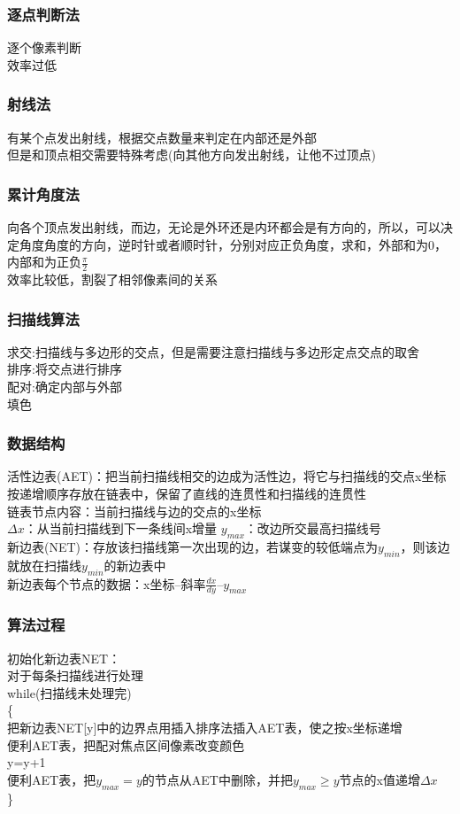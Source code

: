 \documentclass{article}
\begin{document}
\begin{CJK}{UTF8}{gbsn}
	\subsubsection{逐点判断法}
	逐个像素判断\\
	效率过低\\
	\subsubsection{射线法}
	有某个点发出射线，根据交点数量来判定在内部还是外部\\
	但是和顶点相交需要特殊考虑(向其他方向发出射线，让他不过顶点)\\
		\subsubsection{累计角度法}
		向各个顶点发出射线，而边，无论是外环还是内环都会是有方向的，所以，可以决定角度角度的方向，逆时针或者顺时针，分别对应正负角度，求和，外部和为0，内部和为正负$\frac{\pi}{2}$\\
		效率比较低，割裂了相邻像素间的关系\\
	\subsubsection{扫描线算法}
	求交:扫描线与多边形的交点，但是需要注意扫描线与多边形定点交点的取舍\\
	排序:将交点进行排序\\
	配对:确定内部与外部\\
	填色
	\subsubsection*{数据结构}
	活性边表(AET)：把当前扫描线相交的边成为活性边，将它与扫描线的交点x坐标按递增顺序存放在链表中，保留了直线的连贯性和扫描线的连贯性\\
	链表节点内容：当前扫描线与边的交点的x坐标\\
	$\Delta x$：从当前扫描线到下一条线间x增量
	$y_{max}$：改边所交最高扫描线号\\
	新边表(NET)：存放该扫描线第一次出现的边，若谋变的较低端点为$y_{min}$，则该边就放在扫描线$y_{min}$的新边表中\\
	新边表每个节点的数据：x坐标--斜率$\frac{dx}{dy}$--$y_{max}$\\
	\subsubsection*{算法过程}
	初始化新边表NET：\\
	对于每条扫描线进行处理\\
	while(扫描线未处理完)\\
	\{\\
	把新边表NET[y]中的边界点用插入排序法插入AET表，使之按x坐标递增\\
	便利AET表，把配对焦点区间像素改变颜色\\
	y=y+1\\
	便利AET表，把$y_{max}=y$的节点从AET中删除，并把$y_{max}\ge y$节点的x值递增$\Delta x$\\
	\}\\

\end{CJK}
\end{document}
